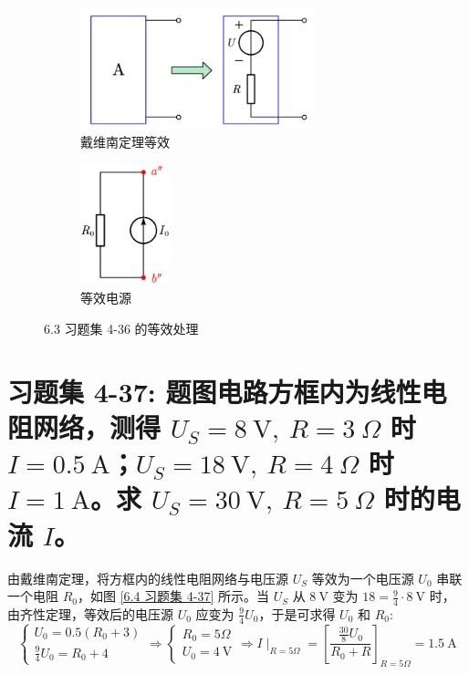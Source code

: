 \documentclass[UTF8]{report}
\theoremstyle{MyLineTheoremStyle} %
\theoremstyle{MyBlockTheoremStyle} %
\theoremstyle{MySubsubsectionStyle} %
\begin{document}
\begin{figure}[H]\centering
\begin{subfigure}[t]{0.6\columnwidth}\centering
    \includegraphics[height=100pt]{assets/6/acd560ff4ae20eb901019a90b84ef837.png}
    \caption{ 戴维南定理等效 }
\end{subfigure}\hfill
\begin{subfigure}[t]{0.4\columnwidth}\centering
    \includegraphics[height=100pt]{assets/6/7367192b138adaf93ddf5c5fcc94a53b.png}
    \caption{ 等效电源 }
\end{subfigure}
\caption{ 6.3 习题集 4-36 的等效处理}\label{6.3 习题集 4-36.2}
\end{figure}

\section{习题集 4-37: 题图电路方框内为线性电阻网络，测得 $U_S = 8 \ \mathrm{V},\ R = 3 \ \Omega$ 时 $I = 0.5 \ \mathrm{A}$；$U_S = 18 \ \mathrm{V},\ R = 4 \ \Omega$ 时 $I = 1 \ \mathrm{A}$。求 $U_S = 30 \ \mathrm{V},\ R = 5 \ \Omega$ 时的电流 $I$。}

由戴维南定理，将方框内的线性电阻网络与电压源 $U_S$ 等效为一个电压源 $U_0$ 串联一个电阻 $R_0$，如图 \ref{6.4 习题集 4-37} 所示。当 $U_S$ 从 $8 \ \mathrm{V}$ 变为 $18 = \frac{9}{4} \cdot 8\ \mathrm{V}$ 时，由齐性定理，等效后的电压源 $U_0$ 应变为 $\frac{9}{4}U_0$，于是可求得 $U_0$ 和 $R_0$:
\begin{equation}
\begin{cases}
    U_0 = 0.5 (R_0 + 3)\\ 
    \frac{9}{4}U_0 =  R_0 + 4
\end{cases} 
\Longrightarrow 
\begin{cases}
    R_0 = 5 \Omega \\ 
    U_0 = 4 \ \mathrm{V}
\end{cases}
\Longrightarrow 
\boxed{
    I\mid_{R = 5 \Omega} = \left[\frac{ \frac{30}{8} U_0}{R_0 + R}\right]_{R = 5 \Omega} = 1.5 \ \mathrm{A}
}
\end{equation}
\end{document}
